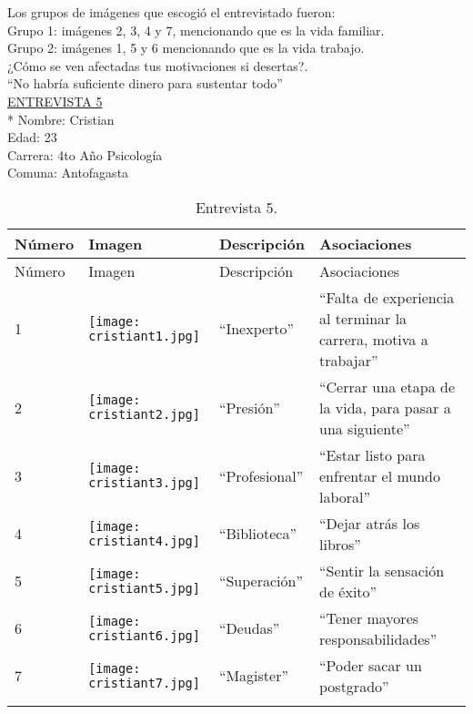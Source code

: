 Los grupos de imágenes que escogió el entrevistado fueron:\\

Grupo 1: imágenes 2, 3, 4 y 7, mencionando que es la vida familiar. \\

Grupo 2: imágenes 1, 5 y 6 mencionando que es la vida trabajo.\\


¿Cómo se ven afectadas tus motivaciones si desertas?.\\

``No habría suficiente dinero para sustentar todo''\\

\underline {ENTREVISTA 5} \\*
Nombre: Cristian\\
Edad: 23\\
Carrera: 4to Año Psicología\\
Comuna: Antofagasta\\

\begin{longtable}{>{\centering\arraybackslash}m{1cm} >{\centering\arraybackslash}m{2cm} >{\arraybackslash}m{5cm}>{\arraybackslash}m{5cm}}
	
	\hline
	Número & Imagen & Descripción & Asociaciones \\
	\hline \hline
	\endfirsthead
	
	\hline
	Número & Imagen & Descripción & Asociaciones \\
	\hline \hline
	\endhead

1 & \texttt{[image: cristiant1.jpg]} & ``Inexperto'' & ``Falta de experiencia al terminar la carrera, motiva a trabajar'' \\
\hline

2 & \texttt{[image: cristiant2.jpg]} & ``Presión'' & ``Cerrar una etapa de la vida, para pasar a una siguiente'' \\
\hline

3 & \texttt{[image: cristiant3.jpg]} & ``Profesional'' & ``Estar listo para enfrentar el mundo laboral'' \\
\hline

4 & \texttt{[image: cristiant4.jpg]} & ``Biblioteca'' & ``Dejar atrás los libros'' \\
\hline

5 & \texttt{[image: cristiant5.jpg]} & ``Superación'' & ``Sentir la sensación de éxito''  \\
\hline

6 & \texttt{[image: cristiant6.jpg]} & ``Deudas'' & ``Tener mayores responsabilidades''\\
\hline

7 & \texttt{[image: cristiant7.jpg]} & ``Magister'' & ``Poder sacar un postgrado'' \\
\hline


\caption{Entrevista 5.}
\label{tabla:cristiant}
\end{longtable}

